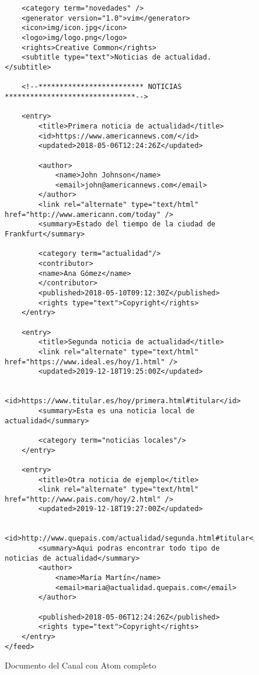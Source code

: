 \begin{enumerate}
\begin{figure}[H]
\begin{tcolorbox}[sharp corners, colback=yellow!30, colframe=white!20]
\begin{verbatim}
    <category term="novedades" />
    <generator version="1.0">vim</generator>
    <icon>img/icon.jpg</icon>
    <logo>img/logo.png</logo>
    <rights>Creative Common</rights>
    <subtitle type="text">Noticias de actualidad.</subtitle>

    <!--************************* NOTICIAS *******************************-->

    <entry>
        <title>Primera noticia de actualidad</title>
        <id>https://www.americannews.com/</id>
        <updated>2018-05-06T12:24:26Z</updated>

        <author>
            <name>John Johnson</name>
            <email>john@americannews.com</email>
        </author>
        <link rel="alternate" type="text/html" href="http://www.americann.com/today" />
        <summary>Estado del tiempo de la ciudad de Frankfurt</summary>

        <category term="actualidad"/>
        <contributor>
        <name>Ana Gómez</name>
        </contributor>
        <published>2018-05-10T09:12:30Z</published>
        <rights type="text">Copyright</rights>
    </entry>

    <entry>
        <title>Segunda noticia de actualidad</title>
        <link rel="alternate" type="text/html" href="https://www.ideal.es/hoy/1.html" />
        <updated>2019-12-18T19:25:00Z</updated>

        <id>https://www.titular.es/hoy/primera.html#titular</id>
        <summary>Esta es una noticia local de actualidad</summary>

        <category term="noticias locales"/>
    </entry>

    <entry>
        <title>Otra noticia de ejemplo</title>
        <link rel="alternate" type="text/html" href="http://www.pais.com/hoy/2.html" />
        <updated>2019-12-18T19:27:00Z</updated>

        <id>http://www.quepais.com/actualidad/segunda.html#titular</id>
        <summary>Aqui podras encontrar todo tipo de noticias de actualidad</summary>
        <author>
            <name>María Martín</name>
            <email>maria@actualidad.quepais.com</email>
        </author>

        <published>2018-05-06T12:24:26Z</published>
        <rights type="text">Copyright</rights>
    </entry>
</feed>
             \end{verbatim}
         \end{tcolorbox}
         \caption{Documento del Canal con Atom completo}
     \end{figure}
\end{enumerate}


